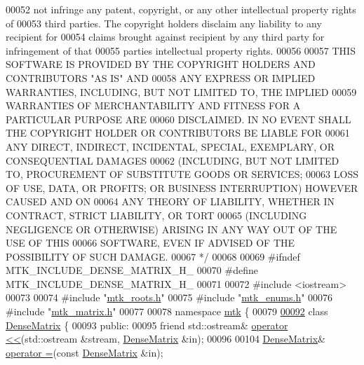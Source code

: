 \begin{DoxyCode}
00052 \textcolor{comment}{not infringe any patent, copyright, or any other intellectual property rights of}
00053 \textcolor{comment}{third parties. The copyright holders disclaim any liability to any recipient for}
00054 \textcolor{comment}{claims brought against recipient by any third party for infringement of that}
00055 \textcolor{comment}{parties intellectual property rights.}
00056 \textcolor{comment}{}
00057 \textcolor{comment}{THIS SOFTWARE IS PROVIDED BY THE COPYRIGHT HOLDERS AND CONTRIBUTORS "AS IS" AND}
00058 \textcolor{comment}{ANY EXPRESS OR IMPLIED WARRANTIES, INCLUDING, BUT NOT LIMITED TO, THE IMPLIED}
00059 \textcolor{comment}{WARRANTIES OF MERCHANTABILITY AND FITNESS FOR A PARTICULAR PURPOSE ARE}
00060 \textcolor{comment}{DISCLAIMED. IN NO EVENT SHALL THE COPYRIGHT HOLDER OR CONTRIBUTORS BE LIABLE FOR}
00061 \textcolor{comment}{ANY DIRECT, INDIRECT, INCIDENTAL, SPECIAL, EXEMPLARY, OR CONSEQUENTIAL DAMAGES}
00062 \textcolor{comment}{(INCLUDING, BUT NOT LIMITED TO, PROCUREMENT OF SUBSTITUTE GOODS OR SERVICES;}
00063 \textcolor{comment}{LOSS OF USE, DATA, OR PROFITS; OR BUSINESS INTERRUPTION) HOWEVER CAUSED AND ON}
00064 \textcolor{comment}{ANY THEORY OF LIABILITY, WHETHER IN CONTRACT, STRICT LIABILITY, OR TORT}
00065 \textcolor{comment}{(INCLUDING NEGLIGENCE OR OTHERWISE) ARISING IN ANY WAY OUT OF THE USE OF THIS}
00066 \textcolor{comment}{SOFTWARE, EVEN IF ADVISED OF THE POSSIBILITY OF SUCH DAMAGE.}
00067 \textcolor{comment}{*/}
00068 
00069 \textcolor{preprocessor}{#ifndef MTK\_INCLUDE\_DENSE\_MATRIX\_H\_}
00070 \textcolor{preprocessor}{#define MTK\_INCLUDE\_DENSE\_MATRIX\_H\_}
00071 
00072 \textcolor{preprocessor}{#include <iostream>}
00073 
00074 \textcolor{preprocessor}{#include "\hyperlink{mtk__roots_8h}{mtk\_roots.h}"}
00075 \textcolor{preprocessor}{#include "\hyperlink{mtk__enums_8h}{mtk\_enums.h}"}
00076 \textcolor{preprocessor}{#include "\hyperlink{mtk__matrix_8h}{mtk\_matrix.h}"}
00077 
00078 \textcolor{keyword}{namespace }\hyperlink{namespacemtk}{mtk} \{
00079 
\hypertarget{mtk__dense__matrix_8h_source_l00092}{}\hyperlink{classmtk_1_1DenseMatrix}{00092} \textcolor{keyword}{class }\hyperlink{classmtk_1_1DenseMatrix}{DenseMatrix} \{
00093  \textcolor{keyword}{public}:
00095   \textcolor{keyword}{friend} std::ostream& \hyperlink{classmtk_1_1DenseMatrix_adbcc850ef373550f634f563573a31d28}{operator <<}(std::ostream &stream, \hyperlink{classmtk_1_1DenseMatrix}{DenseMatrix} &in);
00096 
00104   \hyperlink{classmtk_1_1DenseMatrix}{DenseMatrix}& \hyperlink{classmtk_1_1DenseMatrix_a0d27dc7c4d2c49f391017e392345ced0}{operator =}(\textcolor{keyword}{const} \hyperlink{classmtk_1_1DenseMatrix}{DenseMatrix} &in);

\end{DoxyCode}
